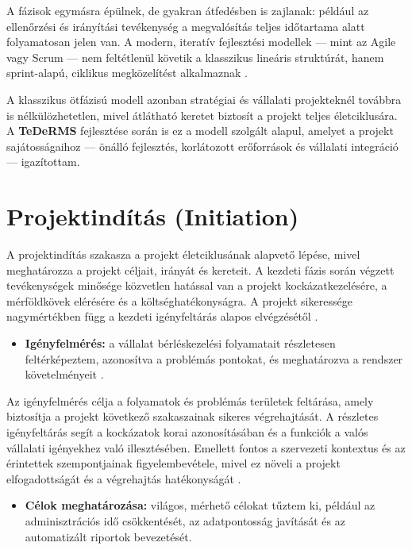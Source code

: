 A fázisok egymásra épülnek, de gyakran átfedésben is zajlanak: például az ellenőrzési és irányítási tevékenység a megvalósítás teljes időtartama alatt folyamatosan jelen van. 
A modern, iteratív fejlesztési modellek — mint az Agile vagy Scrum — nem feltétlenül követik a klasszikus lineáris struktúrát, 
hanem sprint-alapú, ciklikus megközelítést alkalmaznak \cite{Hajdu2014,Kaposi2019}.

A klasszikus ötfázisú modell azonban stratégiai és vállalati projekteknél továbbra is nélkülözhetetlen, 
mivel átlátható keretet biztosít a projekt teljes életciklusára. 
A \textbf{TeDeRMS} fejlesztése során is ez a modell szolgált alapul, amelyet a projekt sajátosságaihoz — önálló fejlesztés, korlátozott erőforrások és vállalati integráció — igazítottam.

\section{Projektindítás (Initiation)}

A projektindítás szakasza a projekt életciklusának alapvető lépése, mivel meghatározza a projekt céljait, irányát és kereteit. 
A kezdeti fázis során végzett tevékenységek minősége közvetlen hatással van a projekt kockázatkezelésére, a mérföldkövek elérésére és a költséghatékonyságra. 
A projekt sikeressége nagymértékben függ a kezdeti igényfeltárás alapos elvégzésétől \cite{Hajdu2014,Szalay2018,Kovacs2016,Kaposi2019}.

\begin{itemize}
    \item \textbf{Igényfelmérés:} a vállalat bérléskezelési folyamatait részletesen feltérképeztem, azonosítva a problémás pontokat, és meghatározva a rendszer követelményeit \cite{Szalay2018}.
\end{itemize}

Az igényfelmérés célja a folyamatok és problémás területek feltárása, amely biztosítja a projekt következő szakaszainak sikeres végrehajtását. 
A részletes igényfeltárás segít a kockázatok korai azonosításában és a funkciók a valós vállalati igényekhez való illesztésében. 
Emellett fontos a szervezeti kontextus és az érintettek szempontjainak figyelembevétele, mivel ez növeli a projekt elfogadottságát és a végrehajtás hatékonyságát \cite{Kovacs2016,Kaposi2019}.

\begin{itemize}
    \item \textbf{Célok meghatározása:} világos, mérhető célokat tűztem ki, például az adminisztrációs idő csökkentését, az adatpontosság javítását és az automatizált riportok bevezetését.
\end{itemize}

